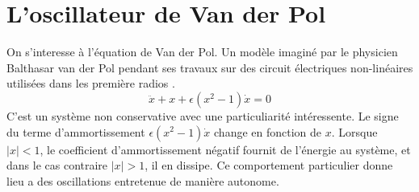 \chapter{L'oscillateur de Van der Pol}
%
On s'interesse à l'équation de Van der Pol. Un modèle imaginé par le physicien Balthasar van der Pol
pendant ses travaux sur des circuit électriques non-linéaires utilisées dans les première radios \cite{strogatz_nonlinear_2015}.
%
\begin{equation}
    \ddot{x} + x + \epsilon(x^2 - 1)\dot{x} = 0
    \label{eq:vdp}
\end{equation}
%
C'est un système non conservative avec une particuliarité intéressente. 
Le signe du terme d'ammortissement $\epsilon(x^2 - 1)\dot{x}$ change en fonction de $x$. 
Lorsque $|x|<1$, le coefficient d'ammortissement négatif fournit de l'énergie au système, et dans le cas contraire $|x|>1$, il en dissipe. 
Ce comportement particulier donne lieu a des oscillations entretenue de manière autonome.
%
%
